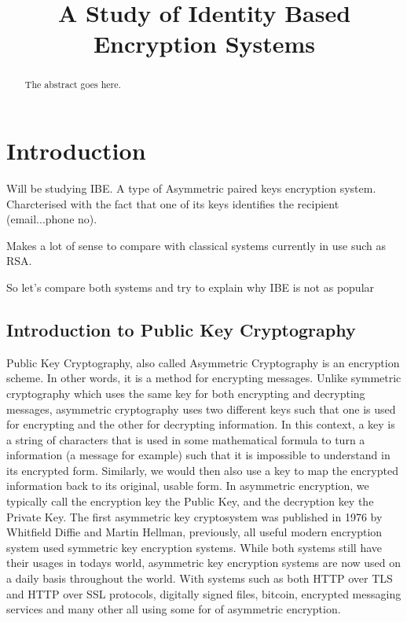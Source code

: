 \documentclass[conference]{IEEEtran}
\begin{document}
\title{A Study of Identity Based Encryption Systems}

\author{
}

\maketitle
\begin{abstract}
The abstract goes here.
\end{abstract}

\section{Introduction}
Will be studying IBE. A type of Asymmetric paired keys 
encryption system. Charcterised with the fact that one of its
keys identifies the recipient (email...phone no).

Makes a lot of sense to compare with classical 
systems currently in use such as RSA.

So let's compare both systems and try to explain why IBE is not as popular

\subsection{Introduction to Public Key Cryptography}
Public Key Cryptography, also called Asymmetric Cryptography is an 
encryption scheme. In other words, it is a method for encrypting messages.
Unlike symmetric cryptography which uses the same key for both encrypting and decrypting
messages, asymmetric cryptography uses two different keys such that one 
is used for encrypting and the other for decrypting information.
In this context, a key is a string of characters that is used in some mathematical
formula to turn a information (a message for example) such that it is impossible to understand in its encrypted form. 
Similarly, we would then also use a key to map the encrypted information back to its original, usable form.
In asymmetric encryption, we typically call the encryption key
the Public Key, and the decryption key the Private Key.
The first asymmetric key cryptosystem was published in 1976 by Whitfield Diffie and Martin Hellman, previously,
all useful modern encryption system used symmetric key encryption systems. 
While both systems still have their usages in todays world,
asymmetric key encryption systems are now used on a daily basis throughout the world. With 
systems such as both HTTP over TLS and HTTP over SSL protocols, digitally signed files, bitcoin,
encrypted messaging services and many other all using some for of asymmetric encryption. 
\end{document}

